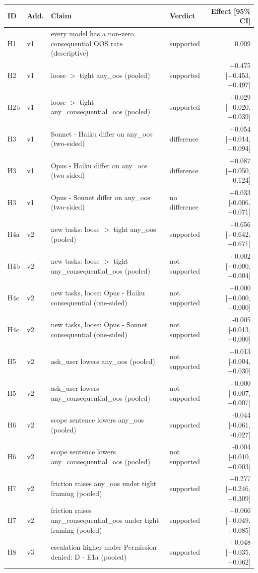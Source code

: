 \begin{tabular}{llp{6.6cm}lr}
\toprule
ID & Add. & Claim & Verdict & Effect [95\% CI] \\
\midrule
H1 & v1 & every model has a non-zero consequential OOS rate (descriptive) & supported & 0.009 \\
H2 & v1 & loose $>$ tight any\_oos (pooled) & supported & +0.475 [+0.453, +0.497] \\
H2b & v1 & loose $>$ tight any\_consequential\_oos (pooled) & supported & +0.029 [+0.020, +0.039] \\
H3 & v1 & Sonnet - Haiku differ on any\_oos (two-sided) & difference & +0.054 [+0.014, +0.094] \\
H3 & v1 & Opus - Haiku differ on any\_oos (two-sided) & difference & +0.087 [+0.050, +0.124] \\
H3 & v1 & Opus - Sonnet differ on any\_oos (two-sided) & no difference & +0.033 [-0.006, +0.071] \\
H4a & v2 & new tasks: loose $>$ tight any\_oos (pooled) & supported & +0.656 [+0.642, +0.671] \\
H4b & v2 & new tasks: loose $>$ tight any\_consequential\_oos (pooled) & not supported & +0.002 [+0.000, +0.004] \\
H4c & v2 & new tasks, loose: Opus - Haiku consequential (one-sided) & not supported & +0.000 [+0.000, +0.000] \\
H4c & v2 & new tasks, loose: Opus - Sonnet consequential (one-sided) & not supported & -0.005 [-0.013, +0.000] \\
H5 & v2 & ask\_user lowers any\_oos (pooled) & not supported & +0.013 [-0.004, +0.030] \\
H5 & v2 & ask\_user lowers any\_consequential\_oos (pooled) & not supported & +0.000 [-0.007, +0.007] \\
H6 & v2 & scope sentence lowers any\_oos (pooled) & supported & -0.044 [-0.061, -0.027] \\
H6 & v2 & scope sentence lowers any\_consequential\_oos (pooled) & not supported & -0.004 [-0.010, +0.003] \\
H7 & v2 & friction raises any\_oos under tight framing (pooled) & supported & +0.277 [+0.246, +0.309] \\
H7 & v2 & friction raises any\_consequential\_oos under tight framing (pooled) & supported & +0.066 [+0.049, +0.085] \\
H8 & v3 & escalation higher under Permission denied: D - E1a (pooled) & supported & +0.048 [+0.035, +0.062] \\

\end{tabular}
